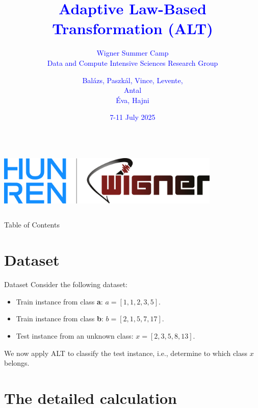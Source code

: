 \documentclass{beamer}
\title{\textcolor{blue}{Adaptive Law-Based Transformation (ALT)}}
\subtitle{\textcolor{blue}{Wigner Summer Camp \\ Data and Compute Intensive Sciences Research Group}}
\author{\textcolor{blue}{Bal\'azs, Paszk\'al, Vince, Levente, \\ Antal \\ \'Eva, Hajni}}
\date{\textcolor{blue}{7-11 July 2025}}
\begin{document}
\begin{frame}
  \titlepage
  \begin{columns}
    \centering
    \includegraphics[width=0.8\textwidth]{img/logo.png}
  \end{columns}
\end{frame}

\begin{frame}{Table of Contents}
  \tableofcontents
\end{frame}

\section{Dataset}

\begin{frame}{Dataset}
  Consider the following dataset:
  \begin{itemize}
    \item Train instance from class \textbf{a}: \( a = [1, 1, 2, 3, 5] \).
    \item Train instance from class \textbf{b}: \( b = [2, 1, 5, 7, 17] \).
    \item Test instance from an unknown class: \( x = [2, 3, 5, 8, 13] \).
  \end{itemize}
  
  We now apply ALT to classify the test instance, i.e., determine to which class \( x \) belongs.
\end{frame}

\section{The detailed calculation}
\end{document}
